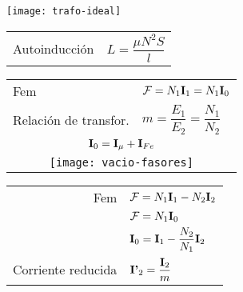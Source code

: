 \documentclass[11pt,a4paper]{article}
\begin{document}
	\begin{cajita}
		
		\texttt{[image: trafo-ideal]}
		\begin{multicols}{2}
		
			\begin{center}
			\end{center}
			
			
			\begin{tabular}{l l}
				Autoinducción & $L = \dfrac{\mu N^2 S}{l}$ \\
			\end{tabular}
		
			
			\begin{tabular}{l l}
				Fem & $\mathcal{F} = N_1  \fasor{i}_1  = N_1  \fasor{i}_0$\\
				Relación de transfor. & $m = \dfrac{E_1}{E_2} = \dfrac{N_1}{N_2}$ \\
				\multicolumn{2}{c}{$ \fasor{i}_0 = \fasor{i}_\mu + \fasor{i}_{Fe} $} \vspace{.1cm} \\ 
				\multicolumn{2}{c}{\texttt{[image: vacio-fasores]}} \\
			\end{tabular} 
		
	
			\begin{center}
			\end{center}
		
			\vspace{-.6cm}
			
		
			\begin{tabular}{r l}
				Fem & $\mathcal{F} = N_1  \fasor{i}_1 - N_2 \fasor{i}_2$\\
				& $\mathcal{F} = N_1 \fasor{i}_0$\\
				& $\fasor{i}_0 = \fasor{i}_1 - \dfrac{N_2}{N_1} \fasor{i}_2$\\
				Corriente reducida & $\fasor{i'}_2 = \dfrac{\fasor{i}_2}{m}$ \\
			\end{tabular}
		
		\end{multicols}
	\end{cajita}
\end{document}

